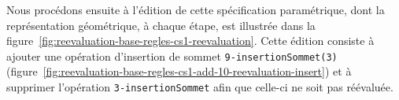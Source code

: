 


Nous procédons ensuite à l'édition de cette spécification paramétrique, dont la
représentation géométrique, à chaque étape, est illustrée dans la
figure~\ref{fig:reevaluation-base-regles-cs1-reevaluation}. %
Cette édition consiste à ajouter une opération d'insertion de sommet
\texttt{9-\allowbreak{}insertion\-Sommet(3)}
(figure~\ref{fig:reevaluation-base-regles-cs1-add-10-reevaluation-insert}) et
à supprimer l'opération \texttt{3-\allowbreak{}insertion\-Sommet} afin que celle-ci ne soit pas
réévaluée. %






